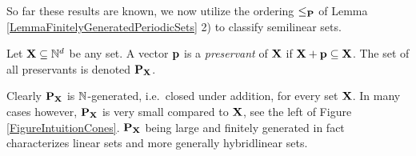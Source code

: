 So far these results are known, we now utilize the ordering \(\leq_{\mathbf{P}}\) of Lemma \ref{LemmaFinitelyGeneratedPeriodicSets} 2) to classify semilinear sets.

\begin{definition} \label{DefinitionPreservants}
Let \(\mathbf{X} \subseteq \mathbb{N}^d\) be any set. A vector \(\mathbf{p}\) is a \emph{preservant} of \(\mathbf{X}\) if \(\mathbf{X}+\mathbf{p} \subseteq \mathbf{X}\). The set of all preservants is denoted \(\operatorname{\mathbf{P}_{\mathbf{X}}}\).
\end{definition}

Clearly \(\operatorname{\mathbf{P}_{\mathbf{X}}}\) is \(\mathbb{N}\)-generated, i.e.\ closed under addition, for every set \(\mathbf{X}\). In many cases however, \(\operatorname{\mathbf{P}_{\mathbf{X}}}\) is very small compared to \(\mathbf{X}\), see the left of Figure \ref{FigureIntuitionCones}. \(\operatorname{\mathbf{P}_{\mathbf{X}}}\) being large and finitely generated in fact characterizes linear sets and more generally hybridlinear sets.

